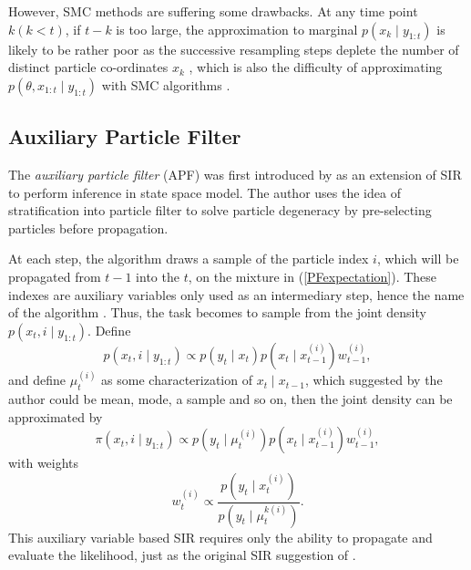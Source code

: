 However, SMC methods are suffering some drawbacks. At any time point $k (k<t)$, if $t-k$ is too large, the approximation to marginal $p(x_k\mid y_{1:t})$ is likely to be rather poor as the successive resampling steps deplete the number of distinct particle co-ordinates $x_k$ \cite{andrieu2010particle}, which is also the difficulty of approximating $p(\theta,x_{1:t}\mid y_{1:t})$ with SMC algorithms 
\cite{andrieu1999sequential} \cite{fearnhead2002markov} \cite{storvik2002particle}. 




\subsection{Auxiliary Particle Filter}

The \textit{auxiliary particle filter} (APF) was first introduced by \cite{pitt1999filtering} as an extension of SIR to perform inference in state space model. The author uses the idea of stratification into particle filter to solve particle degeneracy by pre-selecting particles before propagation. 

At each step, the algorithm draws a sample of the particle index $i$, which will be propagated from $t-1$ into the $t$, on the mixture in (\ref{PFexpectation}). These indexes are auxiliary variables only used as an intermediary step, hence the name of the algorithm \cite{pitt1999filtering}. Thus, the task becomes to sample from the joint density $p(x_t,i\mid y_{1:t})$. Define 
\begin{equation}
p(x_t,i\mid y_{1:t})\propto p(y_t\mid x_t)p(x_t\mid x_{t-1}^{(i)})w_{t-1}^{(i)}, 
\end{equation}
and define $\mu_t^{(i)}$ as some characterization of $x_t\mid x_{t-1}$, which suggested by the author could be mean, mode, a sample and so on, then the joint density can be approximated by  
\begin{equation}
\pi(x_t,i\mid y_{1:t})\propto p(y_t\mid \mu_t^{(i)})p(x_t\mid x_{t-1}^{(i)})w_{t-1}^{(i)}, 
\end{equation}
with weights
\begin{equation*}
w_t^{(i)}\propto \frac{ p(y_t\mid x_t^{(i)})  }{  p(y_t\mid\mu_t^{k(i)})   }.
\end{equation*}
This auxiliary variable based SIR requires only the ability to propagate and evaluate the likelihood, just as the original SIR suggestion of \cite{gordon1993novel}.  

